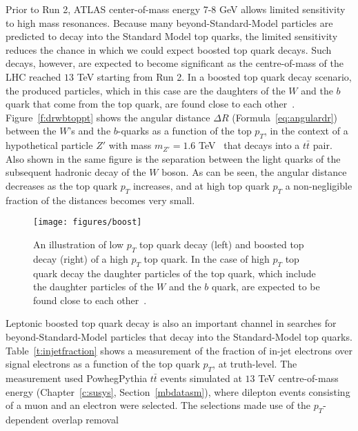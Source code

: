 Prior to Run 2, ATLAS center-of-mass energy 7-8 GeV allows limited sensitivity
to high mass resonances. Because many beyond-Standard-Model particles are
predicted to decay into the Standard Model top quarks, the limited sensitivity
reduces the chance in which we could expect boosted top quark decays. Such
decays, however, are expected to become significant as the centre-of-mass of
the LHC reached $13$ TeV starting from Run 2. In a boosted top quark decay
scenario, the produced particles, which in this case are the daughters of the
$W$ and the $b$ quark that come from the top quark, are found close to each
other~\cite{hadronic01-ch7, hadronic02-ch7, bdis-figs}.
Figure~\ref{f:drwbtoppt} shows the angular distance $\Delta R$
(Formula~\ref{eq:angulardr}) between the $W$'s and the $b$-quarks as a function
of the top $p_T$, in the context of a hypothetical particle $Z'$ with mass
$m_{Z'}=1.6$ TeV~\cite{bdis-figs} that decays into a $t\bar{t}$ pair. Also
shown in the same figure is the separation between the light quarks of the
subsequent hadronic decay of the $W$ boson. As can be seen, the angular
distance decreases as the top quark $p_T$ increases, and at high top quark
$p_T$ a non-negligible fraction of the distances becomes very small.


\vspace{3mm}

\begin{figure}[H]
	\texttt{[image: figures/boost]}
	\centering

	\caption{An illustration of low $p_T$ top quark decay (left) and boosted top
		decay (right) of a high $p_T$ top quark. In the case of high $p_T$ top quark
		decay the daughter particles of the top quark, which include the daughter
		particles of the $W$ and the $b$ quark, are expected to be found close to each
		other~\cite{boostedtop-fig}.}

	\label{f:boosttop}
\end{figure}

\vspace{3mm}

Leptonic boosted top quark decay is also an important channel in searches for
beyond-Standard-Model particles that decay into the Standard-Model top quarks.
Table~\ref{t:injetfraction} shows a measurement of the fraction of in-jet
electrons over signal electrons as a function of the top quark $p_T$, at
truth-level. The measurement used PowhegPythia $t\bar{t}$ events simulated at
$13$ TeV centre-of-mass energy (Chapter~\ref{c:susys}, Section~\ref{mbdatasm}),
where dilepton events consisting of a muon and an electron were selected. The
selections made use of the $p_T$-dependent overlap removal

